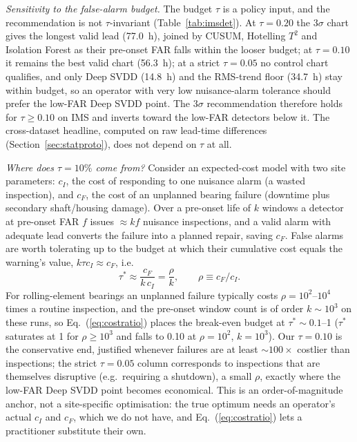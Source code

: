 \documentclass[IJPHM, 2026, 0]{PHMSociety}
\begin{document}
\emph{Sensitivity to the false-alarm budget.} The budget $\tau$ is a policy input, and the recommendation is not $\tau$-invariant (Table~\ref{tab:imsdet}). At $\tau=0.20$ the $3\sigma$ chart gives the longest valid lead (77.0~h), joined by CUSUM, Hotelling $T^2$ and Isolation Forest as their pre-onset FAR falls within the looser budget; at $\tau=0.10$ it remains the best valid chart (56.3~h); at a strict $\tau=0.05$ no control chart qualifies, and only Deep SVDD (14.8~h) and the RMS-trend floor (34.7~h) stay within budget, so an operator with very low nuisance-alarm tolerance should prefer the low-FAR Deep SVDD point. The $3\sigma$ recommendation therefore holds for $\tau \ge 0.10$ on IMS and inverts toward the low-FAR detectors below it. The cross-dataset headline, computed on raw lead-time differences (Section~\ref{sec:statproto}), does not depend on $\tau$ at all.

\emph{Where does $\tau=10\%$ come from?} Consider an expected-cost model with two site parameters: $c_I$, the cost of responding to one nuisance alarm (a wasted inspection), and $c_F$, the cost of an unplanned bearing failure (downtime plus secondary shaft/housing damage). Over a pre-onset life of $k$ windows a detector at pre-onset FAR $f$ issues ${\approx} kf$ nuisance inspections, and a valid alarm with adequate lead converts the failure into a planned repair, saving $c_F$. False alarms are worth tolerating up to the budget at which their cumulative cost equals the warning's value, $k\tau c_I \approx c_F$, i.e.
\begin{equation}
\tau^* \approx \frac{c_F}{k\,c_I} = \frac{\rho}{k}, \qquad \rho \equiv c_F/c_I.
\label{eq:costratio}
\end{equation}
For rolling-element bearings an unplanned failure typically costs $\rho = 10^2$--$10^4$ times a routine inspection, and the pre-onset window count is of order $k \sim 10^3$ on these runs, so Eq.~(\ref{eq:costratio}) places the break-even budget at $\tau^* \sim 0.1$--1 ($\tau^*$ saturates at 1 for $\rho \ge 10^3$ and falls to 0.10 at $\rho=10^2$, $k=10^3$). Our $\tau=0.10$ is the conservative end, justified whenever failures are at least ${\sim}100\times$ costlier than inspections; the strict $\tau=0.05$ column corresponds to inspections that are themselves disruptive (e.g.\ requiring a shutdown), a small $\rho$, exactly where the low-FAR Deep SVDD point becomes economical. This is an order-of-magnitude anchor, not a site-specific optimisation: the true optimum needs an operator's actual $c_I$ and $c_F$, which we do not have, and Eq.~(\ref{eq:costratio}) lets a practitioner substitute their own.
\end{document}

